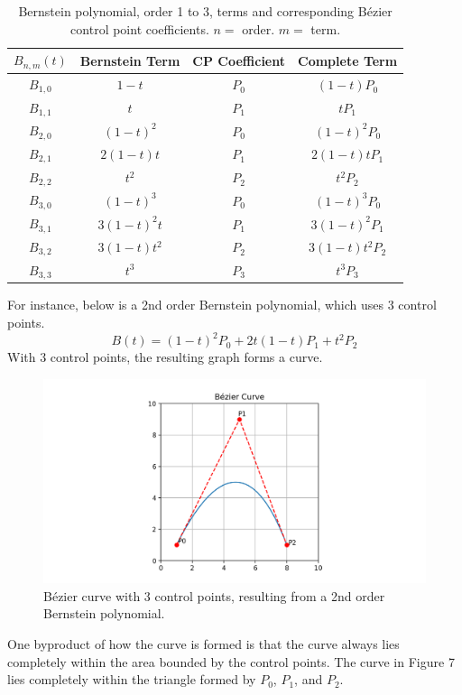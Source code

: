 \documentclass[12pt,letterpaper]{article}
\begin{document}
\begin{table}[H]
\centering
\begin{tabular}{ | c | c c | c | }
\hline
$B_{n,m} (t)$ & Bernstein Term & CP Coefficient & Complete Term \\
\hline
$B_{1,0}$ & $1-t$ 		& $P_0$ & $(1-t)P_0$ 	\\
\hline
$B_{1,1}$ & $t$ 		& $P_1$ & $tP_1$ 		\\
\hline
$B_{2,0}$ & $(1-t)^2$ 	& $P_0$ & $(1-t)^2P_0$ 	\\
\hline
$B_{2,1}$ & $2(1-t)t$ 	& $P_1$ & $2(1-t)tP_1$ 	\\
\hline
$B_{2,2}$ & $t^2$ 		& $P_2$ & $t^2P_2$ 	\\
\hline
$B_{3,0}$ & $(1-t)^3$ 	& $P_0$ & $(1-t)^3P_0$ 	\\
\hline
$B_{3,1}$ & $3(1-t)^2t$ 	& $P_1$ & $3(1-t)^2P_1$ 	\\
\hline
$B_{3,2}$ & $3(1-t)t^2$ 	& $P_2$ & $3(1-t)t^2P_2$\\
\hline
$B_{3,3}$ & $t^3$ 		& $P_3$ & $t^3P_3$ 	\\
\hline
\end{tabular}
\caption{Bernstein polynomial, order 1 to 3, terms and corresponding B\'ezier control point coefficients. $n =$ order. $m =$ term.}
\end{table}

For instance, below is a 2nd order Bernstein polynomial, which uses 3 control points.
$$B(t)= (1-t)^2 P_0+2t(1-t) P_1+t^2 P_2$$
With 3 control points, the resulting graph forms a curve.

\begin{figure}[H]
\includegraphics[width=15cm]{Figure_4}
\centering
\caption{B\'ezier curve with 3 control points, resulting from a 2nd order Bernstein polynomial.}
\end{figure}
One byproduct of how the curve is formed is that the curve always lies completely within the area bounded by the control points. The curve in Figure 7 lies completely within the triangle formed by $P_0$, $P_1$, and $P_2$.
\end{document}
